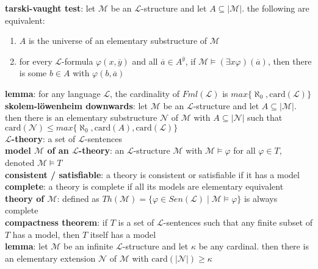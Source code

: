 \documentclass[a4paper]{article}
\newcommand\abs[1]{\ensuremath{\lvert#1\rvert}}
\begin{document}
\begin{framed}
	\noindent
	\textbf{tarski-vaught test}: let $\mathscr{M}$ be an $\mathscr{L}$-structure and let $A \subseteq \abs{\mathscr{M}}$. the following are equivalent:
	\begin{enumerate}[label=(\roman*), itemsep=-3pt, topsep=0pt]
			\item $A$ is the universe of an elementary substructure of $\mathscr{M}$
			\item for every $\mathscr{L}$-formula $\varphi(x, \overline{y})$ and all $\overline{a} \in A^{\overline{y}}$, if $\mathscr{M} \models (\exists x \varphi)(\overline{a})$, then there is some $b \in A$ with $\varphi(b, \overline{a})$\\
		\end{enumerate}
		
	\noindent
	\textbf{lemma}: for any language $\mathscr{L}$, the cardinality of $Fml(\mathscr{L})$ is $max\{\aleph_0, \text{card}(\mathscr{L})\}$\\
	
	\noindent
	\textbf{skolem-l\"owenheim downwards}: let $\mathscr{M}$ be an $\mathscr{L}$-structure and let $A \subseteq \abs{\mathscr{M}}$. then there is an elementary substructure $\mathscr{N}$ of $\mathscr{M}$ with $A \subseteq \abs{\mathscr{N}}$ such that $\text{card}(\mathscr{N}) \leq max\{\aleph_0, \text{card}(A), \text{card}(\mathscr{L})\}$\\
	
	\noindent
	\textbf{$\mathscr{L}$-theory}: a set of $\mathscr{L}$-sentences\\
	\textbf{model $\mathscr{M}$ of an $\mathscr{L}$-theory}: an $\mathscr{L}$-structure $\mathscr{M}$ with $\mathscr{M} \models \varphi$ for all $\varphi \in T$, denoted $\mathscr{M} \models T$\\
	\textbf{consistent / satisfiable}: a theory is consistent or satisfiable if it has a model\\
	\textbf{complete}: a theory is complete if all its models are elementary equivalent\\
	\textbf{theory of $\mathscr{M}$}: defined as $Th(\mathscr{M}) = \{\varphi \in Sen(\mathscr{L}) \; \vert \; \mathscr{M} \models \varphi\}$ is always complete\\
	
	\noindent
	\textbf{compactness theorem}: if $T$ is a set of $\mathscr{L}$-sentences such that any finite subset of $T$ has a model, then $T$ itself has a model\\
	
	\noindent
	\textbf{lemma}: let $\mathscr{M}$ be an infinite $\mathscr{L}$-structure and let $\kappa$ be any cardinal. then there is an elementary extension $\mathscr{N}$ of $\mathscr{M}$ with $\text{card}(\abs{\mathscr{N}}) \geq \kappa$\\
	

\end{framed}
\end{document}
